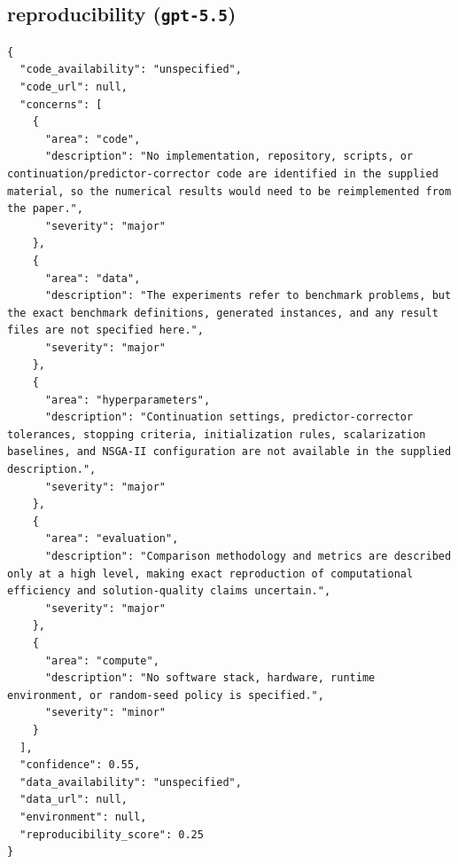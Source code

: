 \documentclass[11pt]{article}
\begin{document}
\subsection*{reproducibility (\texttt{gpt-5.5})}
\begin{verbatim}
{
  "code_availability": "unspecified",
  "code_url": null,
  "concerns": [
    {
      "area": "code",
      "description": "No implementation, repository, scripts, or continuation/predictor-corrector code are identified in the supplied material, so the numerical results would need to be reimplemented from the paper.",
      "severity": "major"
    },
    {
      "area": "data",
      "description": "The experiments refer to benchmark problems, but the exact benchmark definitions, generated instances, and any result files are not specified here.",
      "severity": "major"
    },
    {
      "area": "hyperparameters",
      "description": "Continuation settings, predictor-corrector tolerances, stopping criteria, initialization rules, scalarization baselines, and NSGA-II configuration are not available in the supplied description.",
      "severity": "major"
    },
    {
      "area": "evaluation",
      "description": "Comparison methodology and metrics are described only at a high level, making exact reproduction of computational efficiency and solution-quality claims uncertain.",
      "severity": "major"
    },
    {
      "area": "compute",
      "description": "No software stack, hardware, runtime environment, or random-seed policy is specified.",
      "severity": "minor"
    }
  ],
  "confidence": 0.55,
  "data_availability": "unspecified",
  "data_url": null,
  "environment": null,
  "reproducibility_score": 0.25
}
\end{verbatim}
\end{document}
